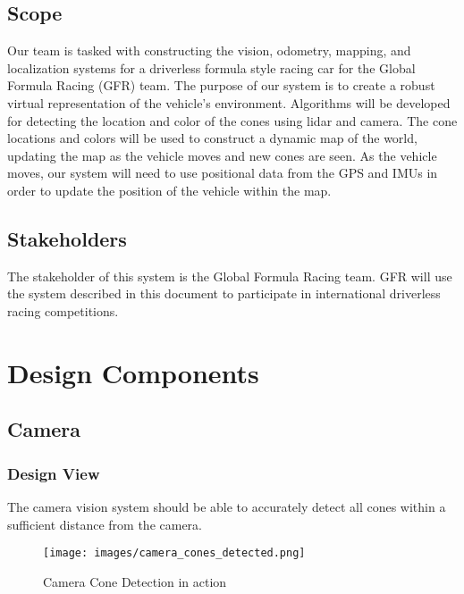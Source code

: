 \documentclass[10pt, onecolumn, draftclsnofoot, letterpaper,compsoc]{IEEEtran}
\begin{document}
\subsection{Scope}
Our team is tasked with constructing the vision, odometry, mapping, and localization systems for a driverless formula style racing car for the Global Formula Racing (GFR) team. The purpose of our system is to create a robust virtual representation of the vehicle's environment. Algorithms will be developed for detecting the location and color of the cones using lidar and camera. The cone locations and colors will be used to construct a dynamic map of the world, updating the map as the vehicle moves and new cones are seen. As the vehicle moves, our system will need to use positional data from the GPS and IMUs in order to update the position of the vehicle within the map. 

\subsection{Stakeholders}
The stakeholder of this system is the Global Formula Racing team. GFR will use the system described in this document to participate in international driverless racing competitions.

\newpage
\section{Design Components}


\subsection{Camera}
\subsubsection{Design View} %

The camera vision system should be able to accurately detect all cones within a sufficient distance from the camera. 

\begin{figure}[H]
\centering
\label{fig:CameraExample}
\caption{Camera Cone Detection in action}
\texttt{[image: images/camera\_cones\_detected.png]}
\end{figure}
\end{document}
